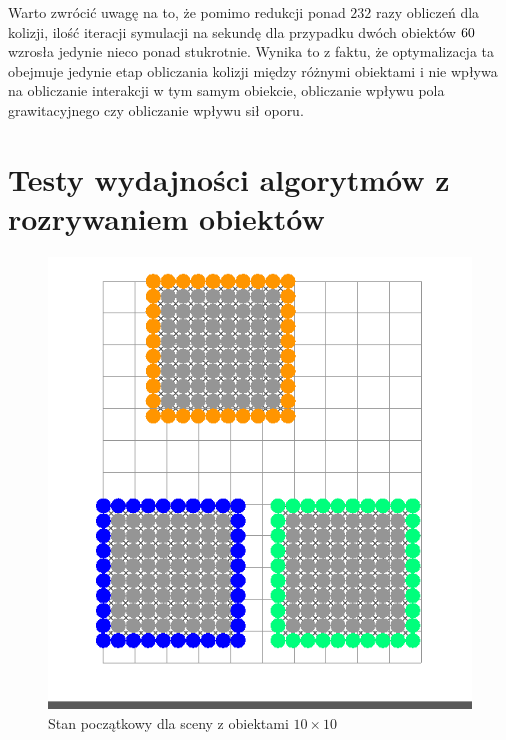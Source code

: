 \documentclass[12pt, letterpaper]{report}
\begin{document}
    Warto zwrócić uwagę na to, że pomimo redukcji ponad $232$ razy obliczeń dla kolizji, 
    ilość iteracji symulacji na sekundę dla przypadku dwóch obiektów $60 \time 60$ wzrosła jedynie
    nieco ponad stukrotnie. Wynika to z faktu, że optymalizacja ta obejmuje jedynie etap obliczania
    kolizji między różnymi obiektami i nie wpływa na obliczanie interakcji w tym samym obiekcie,
    obliczanie wpływu pola grawitacyjnego czy obliczanie wpływu sił oporu.
    
    \section{Testy wydajności algorytmów z rozrywaniem obiektów}
    \begin{figure}
        \includegraphics[width=0.9\linewidth]{app_boundary_performance_10x10_01.png} 
        \caption{Stan początkowy dla sceny z obiektami $10\times10$}

\end{figure}
\end{document}
